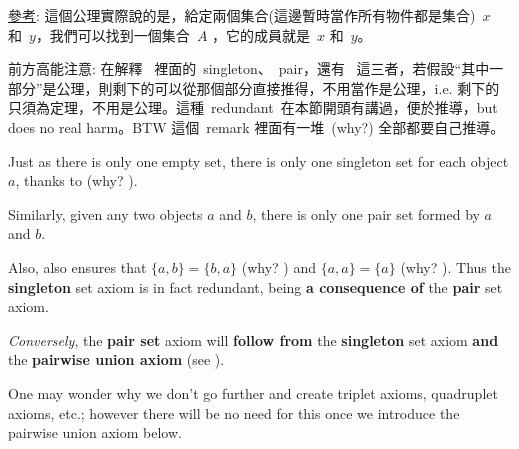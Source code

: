 \begin{note}
\href{https://www.wikiwand.com/en/Axiom_of_pairing#/Consequences}{參考}: 這個公理實際說的是，給定兩個集合(這邊暫時當作所有物件都是集合)\ \(x\) 和\ \(y\)，我們可以找到一個集合\ \(A\) ，它的成員就是\ \(x\) 和\ \(y\)。
\end{note}

\begin{note}
前方高能注意:  在解釋\  裡面的\ singleton、\ pair，還有\  這三者，若假設``其中一部分''是公理，則剩下的可以從那個部分直接推得，不用當作是公理，i.e. 剩下的只須為定理，不用是公理。這種\ redundant\ 在本節開頭有講過，便於推導，but does no real harm。BTW 這個\ remark 裡面有一堆\ (why?) 全部都要自己推導。
\end{note}

\begin{remark} \label{remark 3.1.9}

Just as there is only one empty set, there is only one singleton set for each object \(a\), thanks to  (why? ).

Similarly, given any two objects \(a\) and \(b\), there is only one pair set formed by \(a\) and \(b\).

Also,  also ensures that \( \{a, b\} = \{b, a\} \) (why? ) and \( \{a, a\} = \{a\} \) (why? ). Thus the \textbf{singleton} set axiom is in fact redundant, being \textbf{a consequence of} the \textbf{pair} set axiom.

\emph{Conversely}, the \textbf{pair set} axiom will \textbf{follow from} the \textbf{singleton} set axiom \textbf{and} the \textbf{pairwise union axiom } (see  ).

One may wonder why we don’t go further and create triplet axioms, quadruplet axioms, etc.; however there will be no need for this once we introduce the pairwise union axiom
below.
\end{remark}

